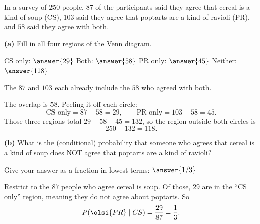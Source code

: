 \documentclass[12pt]{ximera}
\begin{document}
\begin{problem}
In a survey of $250$ people, $87$ of the participants said they agree that cereal is
a kind of soup (CS), $103$ said they agree that poptarts are a kind of ravioli (PR),
and $58$ said they agree with both.

\begin{prompt}
\textbf{(a)} Fill in all four regions of the Venn diagram.

\begin{center}
\end{center}

CS only: $\answer{29}$ \qquad
Both: $\answer{58}$ \qquad
PR only: $\answer{45}$ \qquad
Neither: $\answer{118}$

\begin{hint}
The $87$ and $103$ each already include the $58$ who agreed with both.
\end{hint}

\begin{feedback}
The overlap is $58$. Peeling it off each circle:
\[
\text{CS only} = 87-58 = 29, \qquad \text{PR only} = 103-58 = 45.
\]
Those three regions total $29+58+45=132$, so the region outside both circles is
\[ 250-132 = 118. \]
\end{feedback}
\end{prompt}

\begin{prompt}
\textbf{(b)} What is the (conditional) probability that someone who agrees that cereal
is a kind of soup does NOT agree that poptarts are a kind of ravioli?

Give your answer as a fraction in lowest terms: $\answer{1/3}$

\begin{feedback}
Restrict to the $87$ people who agree cereal is soup. Of those, $29$ are in the ``CS
only'' region, meaning they do not agree about poptarts. So
\[
P\!\left(\olsi{PR}\mid CS\right)=\frac{29}{87}=\frac13.
\]
\end{feedback}
\end{prompt}
\end{problem}
\end{document}
